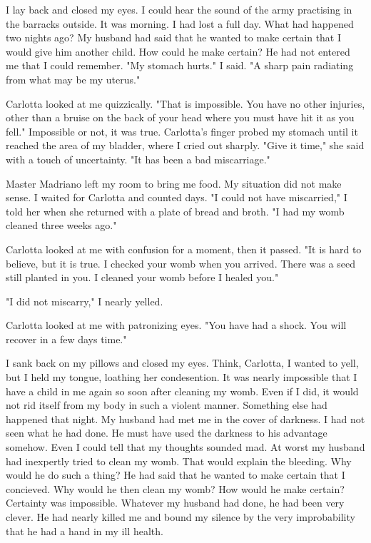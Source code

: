 \documentclass{article}
\begin{document}
I lay back and closed my eyes. I could hear the sound of the army practising in the barracks outside. It was morning. I had lost a full day. What had happened two nights ago? My husband had said that he wanted to make certain that I would give him another child. How could he make certain? He had not entered me that I could remember. "My stomach hurts." I said. "A sharp pain radiating from what may be my uterus."

Carlotta looked at me quizzically. "That is impossible. You have no other injuries, other than a bruise on the back of your head where you must have hit it as you fell." Impossible or not, it was true. Carlotta's finger probed my stomach until it reached the area of my bladder, where I cried out sharply. "Give it time," she said with a touch of uncertainty. "It has been a bad miscarriage."

Master Madriano left my room to bring me food. My situation did not make sense. I waited for Carlotta and counted days. "I could not have miscarried," I told her when she returned with a plate of bread and broth. "I had my womb cleaned three weeks ago."

Carlotta looked at me with confusion for a moment, then it passed. "It is hard to believe, but it is true. I checked your womb when you arrived. There was a seed still planted in you. I cleaned your womb before I healed you."

"I did not miscarry," I nearly yelled.

Carlotta looked at me with patronizing eyes. "You have had a shock. You will recover in a few days time."

I sank back on my pillows and closed my eyes. Think, Carlotta, I wanted to yell, but I held my tongue, loathing her condesention. It was nearly impossible that I have a child in me again so soon after cleaning my womb. Even if I did, it would not rid itself from my body in such a violent manner. Something else had happened that night. My husband had met me in the cover of darkness. I had not seen what he had done. He must have used the darkness to his advantage somehow. Even I could tell that my thoughts sounded mad. At worst my husband had inexpertly tried to clean my womb. That would explain the bleeding. Why would he do such a thing? He had said that he wanted to make certain that I concieved. Why would he then clean my womb? How would he make certain? Certainty was impossible. Whatever my husband had done, he had been very clever. He had nearly killed me and bound my silence by the very improbability that he had a hand in my ill health.
\end{document}

